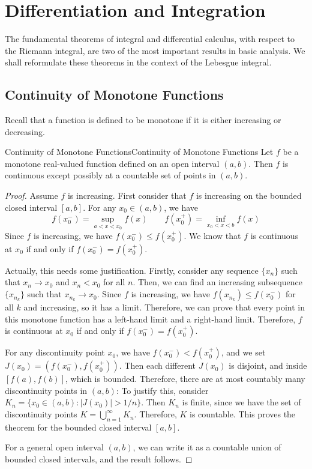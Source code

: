 \documentclass[../main.tex]{subfiles}
\begin{document}
\chapter{Differentiation and Integration}

The fundamental theorems of integral and differential calculus, with respect to the Riemann integral, are two of the most important results in basic analysis. We shall reformulate these theorems in the context of the Lebesgue integral.

\section{Continuity of Monotone Functions}
Recall that a function is defined to be monotone if it is either increasing or decreasing.

\begin{theorem}{Continuity of Monotone Functions}{Continuity of Monotone Functions}
  Let $f$ be a monotone real-valued function defined on an open interval $(a,b)$. Then $f$ is continuous except possibly at a countable set of points in $(a,b)$.
\end{theorem}
\begin{proof}
  Assume $f$ is increasing. First consider that $f$ is increasing on the bounded closed interval $[a,b]$. For any $x_0 \in (a,b)$, we have
  \begin{equation*}
    f(x_0^-) = \sup_{a < x < x_0} f(x) \qquad f(x_0^+) = \inf_{x_0 < x < b} f(x)
  \end{equation*}
  Since $f$ is increasing, we have $f(x_0^-) \leq f(x_0^+)$. We know that $f$ is continuous at $x_0$ if and only if $f(x_0^-) = f(x_0^+)$.

  Actually, this needs some justification. Firstly, consider any sequence $\{x_n\}$ such that $x_n \to x_0$ and $x_n < x_0$ for all $n$. Then, we can find an increasing subsequence $\{x_{n_k}\}$ such that $x_{n_k} \to x_0$. Since $f$ is increasing, we have $f(x_{n_k}) \leq f(x_0^-)$ for all $k$ and increasing, so it has a limit. Therefore, we can prove that every point in this monotone function has a left-hand limit and a right-hand limit. Therefore, $f$ is continuous at $x_0$ if and only if $f(x_0^-) = f(x_0^+)$.

  For any discontinuity point $x_0$, we have $f(x_0^-) < f(x_0^+)$, and we set $J(x_0) = (f(x_0^-), f(x_0^+))$. Then each different $J(x_0)$ is disjoint, and inside $[f(a), f(b)]$, which is bounded. Therefore, there are at most countably many discontinuity points in $(a,b)$: To justify this, consider $K_n = \{x_0 \in (a,b) : |J(x_0)| > 1/n\}$. Then $K_n$ is finite, since we have the set of discontinuity points $K = \bigcup_{n=1}^{\infty} K_n$. Therefore, $K$ is countable. This proves the theorem for the bounded closed interval $[a,b]$.

  For a general open interval $(a,b)$, we can write it as a countable union of bounded closed intervals, and the result follows.
\end{proof}
\end{document}
